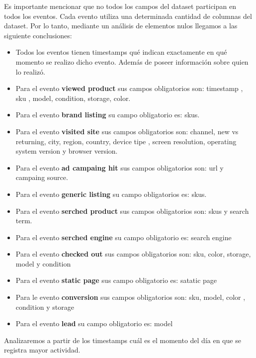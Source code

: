 \documentclass[titlepage,a4paper]{article}
\begin{document}
	Es importante mencionar que no todos los campos del dataset participan en todos los eventos. Cada evento utiliza una determinada cantidad de columnas del dataset. Por lo tanto, mediante un análisis de elementos nulos llegamos a las siguiente conclusiones:
	\begin{itemize}
		\item Todos los eventos tienen timestamps qué indican exactamente en qué momento se realizo dicho evento. Además de poseer información sobre quien lo realizó. 
		\item Para el evento \textbf{viewed product} sus campos obligatorios son: timestamp , sku , model, condition, storage, color.
		\item Para el evento \textbf{brand listing} su campo obligatorio es: skus. 
		\item Para el evento \textbf{visited site} sus campos obligatorios son: channel, new vs returning, city, region, country, device tipe , screen resolution, operating system version y browser version.
		\item Para el evento \textbf{ad campaing hit} sus campos obligatorios son: url  y campaing source.
		\item Para el evento \textbf{generic listing} su campo obligatorios es: skus.
		\item Para el evento  \textbf{serched product } sus campos obligatorios son: skus y search term.
		\item Para el evento \textbf{serched engine} su campo obligatorio es: search engine
		\item Para el evento \textbf{checked out}  sus campos obligatorios son: sku, color, storage, model y condition 
		\item Para el evento \textbf{static page}  sus campo obligatorio es: satatic page
		\item Para le evento \textbf{conversion} sus campos obligatorios son:  sku, model, color , condition y storage
		\item Para el evento \textbf{lead} su campo obligatorio es: model
	\end{itemize}	
	Analizaremos a partir de los timestamps cuál es el momento del día en que se registra mayor actividad.
\end{document}
